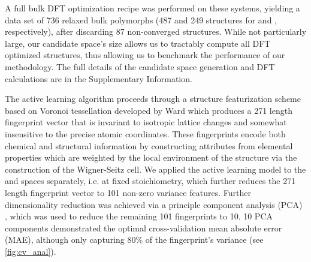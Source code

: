 %
A full bulk DFT optimization recipe was performed on these systems,
yielding a data set of \num{736} relaxed bulk \IrOx polymorphs
(\num{487} and \num{249} structures for \IrOtwo and \IrOthree, respectively),
after discarding 87 non-converged structures.
%
While not particularly large, our candidate space's size allows us to tractably compute all DFT optimized structures, thus allowing us to benchmark the performance of our methodology.
%
The full details of the candidate space generation and DFT calculations are in the Supplementary Information.


%
The active learning algorithm proceeds through a structure featurization scheme based on Voronoi tessellation developed by Ward  \cite{Ward2017} which produces a \num{271} length fingerprint vector that is invariant to isotropic lattice changes and somewhat insensitive to the precise atomic coordinates.
%
These fingerprints encode both chemical and structural information by constructing attributes from elemental properties which are weighted by the local environment of the structure via the construction of the Wigner-Seitz cell.
\cite{Wigner1933}
%
We applied the active learning model to the \IrOtwo and \IrOthree spaces separately, i.e. at fixed stoichiometry, which further reduces the \num{271} length fingerprint vector to \num{101} non-zero variance features.
%
Further dimensionality reduction was achieved via a principle component analysis (PCA) \cite{Tipping1999}, which was used to reduce the remaining \num{101} fingerprints to \num{10}.
%
\num{10} PCA components demonstrated the optimal cross-validation mean absolute error (MAE), although only capturing 80\% of the fingerprint's variance (see \ref{fig:cv_anal}).


